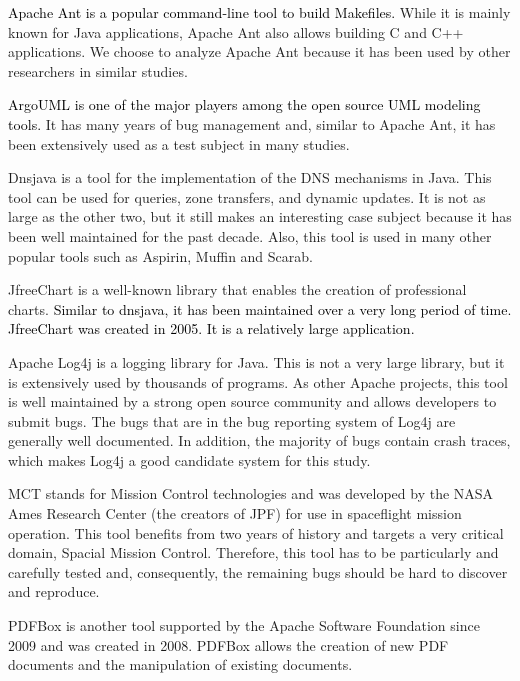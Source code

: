 \documentclass[times, doublespace]{smrauth}
\newcommand{\red}[1]{\textcolor{black}{#1}}
\begin{document}
{\red{Apache Ant \cite{ApacheSoftwareFoundation} is a popular command-line tool to build
Makefiles.} While it is mainly known for Java applications,
Apache Ant also allows building C and C++ applications. We
choose to analyze Apache Ant because it has been used by
other researchers in similar studies.

\red{ArgoUML \cite{CollabNet} is one of the major players among the open source
UML modeling tools.} It has many years of bug management
and, similar to Apache Ant, it has been extensively used as a
test subject in many studies.

Dnsjava \cite{Wellington2013} is a tool for the implementation of the DNS
mechanisms in Java. This tool can be used for queries, zone
transfers, and dynamic updates. It is not as large as the other
two, but it still makes an interesting case subject because it has
been well maintained for the past decade. Also, this tool is
used in many other popular tools such as Aspirin, Muffin and
Scarab.

JfreeChart \cite{ObjectRefineryLimited2005} is a well-known library that enables the
creation of professional charts. \red{Similar to dnsjava, it has been
maintained over a very long period of time. JfreeChart was
created in 2005. It is a relatively large application.}

Apache Log4j \cite{TheApacheSoftwareFoundation1999} is a logging library for Java.
This is not a
very large library, but it is extensively used by thousands of
programs. As other Apache projects, this tool is well
maintained by a strong open source community and allows
developers to submit bugs. The bugs that are in the bug
reporting system of Log4j are generally well
documented. In addition, the majority of bugs contain crash
traces, which makes Log4j a good candidate system for this study.

MCT \cite{NASA2009} stands for Mission Control technologies and was
developed by the NASA Ames Research Center (the creators
of JPF) for use in spaceflight mission operation. This tool
benefits from two years of history and targets a very critical
domain, Spacial Mission Control. Therefore, this tool has to
be particularly and carefully tested and, consequently, the
remaining bugs should be hard to discover and reproduce.

PDFBox \cite{ApacheSoftwareFoundation2014} is another tool supported by the Apache
Software Foundation since 2009 and was created in 2008.
PDFBox allows the creation of new PDF documents and the
manipulation of existing documents.

}
\end{document}
